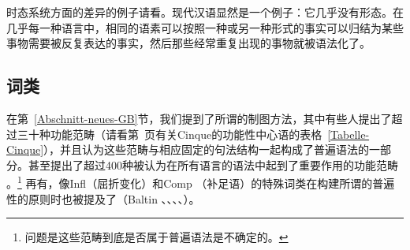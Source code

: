 时态系统方面的差异的例子请看。现代汉语显然是一个例子：它几乎没有形态。在几乎每一种语言中，相同的语素可以按照一种或另一种形式的事实可以归结为某些事物需要被反复表达的事实，然后那些经常重复出现的事物就被语法化了。


\subsection{词类}
\label{Abschnitt-UG-Wortarten}

在第~\ref{Abschnitt-neues-GB}节，我们提到了所谓的制图方法，其中有些人提出了超过三十种功能范畴（请看第~\pageref{Tabelle-Cinque}页有关Cinque的功能性中心语的表格~\ref{Tabelle-Cinque}），并且认为这些范畴与相应固定的句法结构一起构成了普遍语法的一部分。\citet[, 57]{CR2010a}甚至提出了超过400种被认为在所有语言的语法中起到了重要作用的功能范畴
。\footnote{
问题是这些范畴到底是否属于普遍语法是不确定的。
}
再有，像\mbox{Infl}（屈折变化）和Comp （补足语）的特殊词类在构建所谓的普遍性的原则时也被提及了（Baltin \citeyear[]{Baltin81a}、\citeyear{Baltin2006a}、\citealp{Rizzi82b}、\citealp[]{Chomsky86b}、\citealp[]{Hornstein2013a}）。

